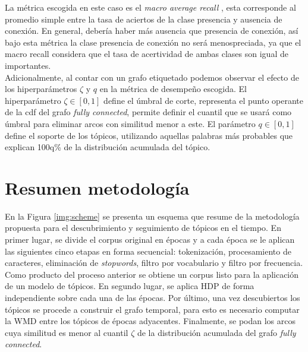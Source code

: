 La métrica escogida en este caso es el \textit{macro average recall} \citep{forman2003extensive}, esta corresponde al promedio simple entre la tasa de aciertos de la clase presencia y ausencia de conexión. En general, debería haber más ausencia que presencia de conexión, así bajo esta métrica la clase presencia de conexión no será menospreciada, ya que el macro recall considera que el tasa de acertividad de ambas clases son igual de importantes.\\

Adicionalmente, al contar con un grafo etiquetado podemos observar el efecto de los hiperparámetros $\zeta$ y $q$ en la métrica de desempeño escogida. El hiperparámetro $\zeta\in[0,1]$ define el úmbral de corte, representa el punto operante de la cdf del grafo \textit{fully connected}, permite definir el cuantil que se usará como úmbral para eliminar arcos con similitud menor a este. El parámetro $q \in [0,1]$ define el soporte de los tópicos, utilizando aquellas palabras más probables que explican 100q\% de la distribución acumulada del tópico. 

\section{Resumen metodología}

En la Figura \ref{img:scheme} se presenta un esquema que resume de la metodología propuesta para el descubrimiento y seguimiento de tópicos en el tiempo. En primer lugar, se divide el corpus original en épocas y a cada época se le aplican las siguientes cinco etapas en forma secuencial: tokenización, procesamiento de caracteres, eliminación de \textit{stopwords}, filtro por vocabulario y filtro por frecuencia. Como producto del proceso anterior se obtiene un corpus listo para la aplicación de un modelo de tópicos. En segundo lugar, se aplica HDP de forma independiente sobre cada una de las épocas. Por último, una vez descubiertos los tópicos se procede a construir el grafo temporal, para esto es necesario computar la WMD entre los tópicos de épocas adyacentes. Finalmente, se podan los arcos cuya similitud es menor al cuantil $\zeta$ de la distribución acumulada del grafo \textit{fully connected}.

\def\db[#1,#2,#3,#4,#5]#6{%
  \node[draw, cylinder, alias=cyl, shape border rotate=90, aspect=#3, %
  minimum height=#1, minimum width=#2, outer sep=-0.5, color=black] (#4) at #5 {};%
  \node at #5 {#6};%
}
\def\boxtext[#1,#2,#3,#4,#5]#6{
        \node[draw=black, rounded corners, minimum height=#1,minimum width=#2, text width=6em] (#4) at #5 {}; 
        \node[anchor=#3,inner sep=4pt,] at (#4.#3)  {#6};
}
\def\isaedge[#1,#2,#3,#4];{ 
  \draw[-triangle 60,color=black!20!black,#4,fill=white] (#1) -- #3
  (#2);  
}

